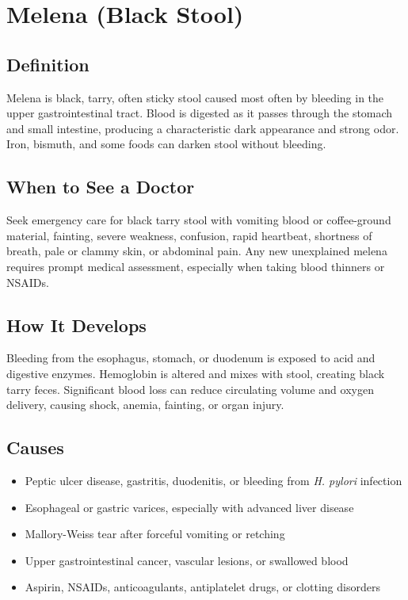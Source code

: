 \chapter{Melena (Black Stool)}

\section*{Definition}
Melena is black, tarry, often sticky stool caused most often by bleeding in the upper gastrointestinal tract. Blood is digested as it passes through the stomach and small intestine, producing a characteristic dark appearance and strong odor. Iron, bismuth, and some foods can darken stool without bleeding.

\section*{When to See a Doctor}
Seek emergency care for black tarry stool with vomiting blood or coffee-ground material, fainting, severe weakness, confusion, rapid heartbeat, shortness of breath, pale or clammy skin, or abdominal pain. Any new unexplained melena requires prompt medical assessment, especially when taking blood thinners or NSAIDs.

\section*{How It Develops}
Bleeding from the esophagus, stomach, or duodenum is exposed to acid and digestive enzymes. Hemoglobin is altered and mixes with stool, creating black tarry feces. Significant blood loss can reduce circulating volume and oxygen delivery, causing shock, anemia, fainting, or organ injury.

\section*{Causes}
\begin{itemize}
  \item Peptic ulcer disease, gastritis, duodenitis, or bleeding from \textit{H. pylori} infection
  \item Esophageal or gastric varices, especially with advanced liver disease
  \item Mallory-Weiss tear after forceful vomiting or retching
  \item Upper gastrointestinal cancer, vascular lesions, or swallowed blood
  \item Aspirin, NSAIDs, anticoagulants, antiplatelet drugs, or clotting disorders
\end{itemize}

